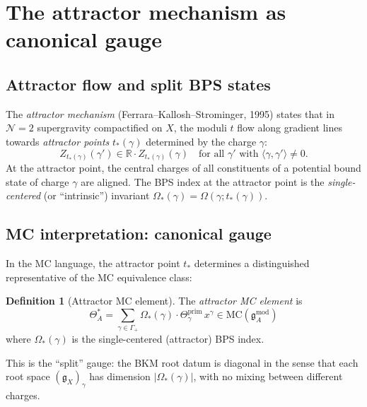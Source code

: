 \documentclass[11pt]{article}
\theoremstyle{definition}
\newtheorem{definition}[theorem]{Definition}
\theoremstyle{remark}
\newcommand{\frakg}{\mathfrak{g}}
\newcommand{\MC}{\mathrm{MC}}
\newcommand{\cN}{\mathcal{N}}
\begin{document}
\section{The attractor mechanism as canonical gauge}
\label{sec:attractor}

\subsection{Attractor flow and split BPS states}
\label{ssec:attractor-flow}

The \emph{attractor mechanism} (Ferrara--Kallosh--Strominger, 1995) states
that in $\cN = 2$ supergravity compactified on $X$, the moduli $t$ flow
along gradient lines towards \emph{attractor points} $t_*(\gamma)$
determined by the charge $\gamma$:
\begin{equation}\label{eq:attractor}
 Z_{t_*(\gamma)}(\gamma') \in \mathbb{R} \cdot Z_{t_*(\gamma)}(\gamma)
 \quad \text{for all } \gamma' \text{ with } \langle \gamma, \gamma'
 \rangle \neq 0.
\end{equation}
At the attractor point, the central charges of all constituents of a
potential bound state of charge $\gamma$ are aligned. The BPS index at
the attractor point is the \emph{single-centered} (or ``intrinsic'')
invariant $\Omega_*(\gamma) = \Omega(\gamma; t_*(\gamma))$.

\subsection{MC interpretation: canonical gauge}
\label{ssec:canonical-gauge}

In the MC language, the attractor point $t_*$ determines a distinguished
representative of the MC equivalence class:

\begin{definition}[Attractor MC element]
\label{def:attractor-mc}
The \emph{attractor MC element} is
\begin{equation}\label{eq:theta-attractor}
 \Theta_A^* = \sum_{\gamma \in \Gamma_+}
 \Omega_*(\gamma) \cdot \Theta_\gamma^{\mathrm{prim}} \, x^\gamma
 \in \MC(\frakg^{\mathrm{mod}}_A)
\end{equation}
where $\Omega_*(\gamma)$ is the single-centered (attractor) BPS index.
\end{definition}

This is the ``split'' gauge: the BKM root datum is diagonal in the sense
that each root space $(\frakg_X)_\gamma$ has dimension $|\Omega_*(\gamma)|$,
with no mixing between different charges.
\end{document}
